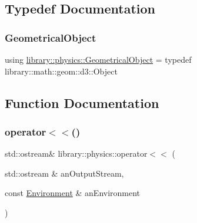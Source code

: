 \subsection{Typedef Documentation}
\mbox{\label{namespacelibrary_1_1physics_a188a48c84b083aea628a2bd98f6b8e0a}} 
\subsubsection{\texorpdfstring{Geometrical\+Object}{GeometricalObject}}
{\footnotesize\ttfamily using \hyperlink{namespacelibrary_1_1physics_a188a48c84b083aea628a2bd98f6b8e0a}{library\+::physics\+::\+Geometrical\+Object} = typedef library\+::math\+::geom\+::d3\+::\+Object}



\subsection{Function Documentation}
\mbox{\label{namespacelibrary_1_1physics_a3786f2dadc91182f9f027bf75bb186ce}} 
\subsubsection{\texorpdfstring{operator$<$$<$()}{operator<<()}}
{\footnotesize\ttfamily std\+::ostream\& library\+::physics\+::operator$<$$<$ (\begin{DoxyParamCaption}\item[{std\+::ostream \&}]{an\+Output\+Stream,  }\item[{const \hyperlink{classlibrary_1_1physics_1_1_environment}{Environment} \&}]{an\+Environment }\end{DoxyParamCaption})}

